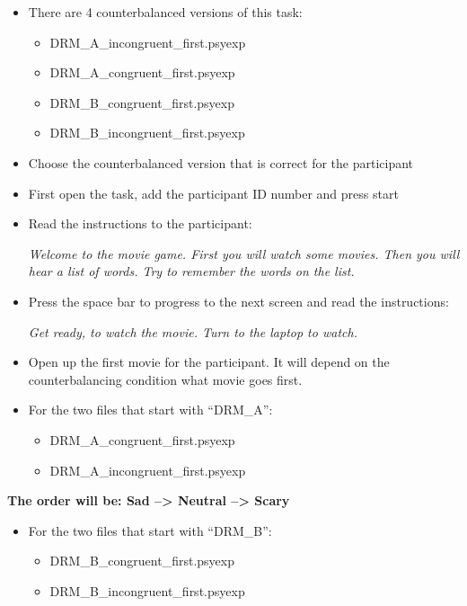 \documentclass[]{book}
\providecommand{\tightlist}{%
  \setlength{\itemsep}{0pt}\setlength{\parskip}{0pt}}
\begin{document}
\begin{itemize}
\item
  There are 4 counterbalanced versions of this task:

  \begin{itemize}
  \tightlist
  \item
    DRM\_A\_incongruent\_first.psyexp
  \item
    DRM\_A\_congruent\_first.psyexp
  \item
    DRM\_B\_congruent\_first.psyexp
  \item
    DRM\_B\_incongruent\_first.psyexp
  \end{itemize}
\item
  Choose the counterbalanced version that is correct for the participant
\item
  First open the task, add the participant ID number and press start
\item
  Read the instructions to the participant:

  \emph{Welcome to the movie game. First you will watch some movies. Then you will hear a list of words. Try to remember the words on the list.}
\item
  Press the space bar to progress to the next screen and read the instructions:

  \emph{Get ready, to watch the movie. Turn to the laptop to watch.}
\item
  Open up the first movie for the participant. It will depend on the counterbalancing condition what movie goes first.
\item
  For the two files that start with ``DRM\_A'':

  \begin{itemize}
  \tightlist
  \item
    DRM\_A\_congruent\_first.psyexp
  \item
    DRM\_A\_incongruent\_first.psyexp
  \end{itemize}
\end{itemize}

\textbf{The order will be: Sad --\textgreater{} Neutral --\textgreater{} Scary}

\begin{itemize}
\tightlist
\item
  For the two files that start with ``DRM\_B'':

  \begin{itemize}
  \tightlist
  \item
    DRM\_B\_congruent\_first.psyexp
  \item
    DRM\_B\_incongruent\_first.psyexp
  \end{itemize}
\end{itemize}
\end{document}
